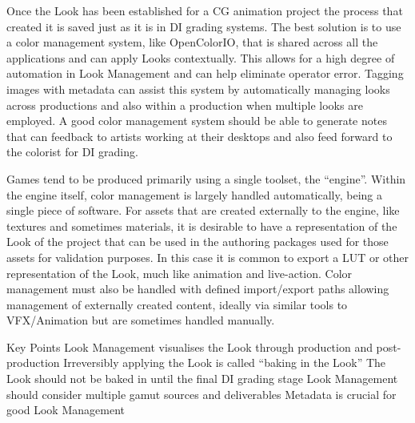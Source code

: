 Once the Look has been established for a CG animation project the process that created it is saved just as it is in DI grading systems. The best solution is to use a color management system, like OpenColorIO, that is shared across all the applications and can apply Looks contextually. This allows for a high degree of automation in Look Management and can help eliminate operator error. Tagging images with metadata can assist this system by automatically managing looks across productions and also within a production when multiple looks are employed. A good color management system should be able to generate notes that can feedback to artists working at their desktops and also feed forward to the colorist for DI grading.

Games tend to be produced primarily using a single toolset, the “engine”. Within the engine itself, color management is largely handled automatically, being a single piece of software. For assets that are created externally to the engine, like textures and sometimes materials, it is desirable to have a representation of the Look of the project that can be used in the authoring packages used for those assets for validation purposes. In this case it is common to export a LUT or other representation of the Look, much like animation and live-action. Color management must also be handled with defined import/export paths allowing management of externally created content, ideally via similar tools to VFX/Animation but are sometimes handled manually.

Key Points
Look Management visualises the Look through production and post-production
Irreversibly applying the Look is called “baking in the Look”
The Look should not be baked in until the final DI grading stage
Look Management should consider multiple gamut sources and deliverables
Metadata is crucial for good Look Management

 
